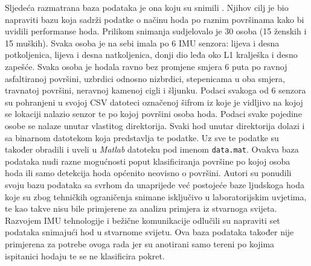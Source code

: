 \documentclass[times, utf8, diplomski]{fer}
\begin{document}
Sljedeća razmatrana baza podataka je ona koju su snimili \cite{uneven}. Njihov cilj je bio napraviti bazu koja sadrži podatke o
načinu hoda po raznim površinama kako bi uvidili performanse hoda. Prilikom snimanja sudjelovalo je 30 osoba (15 ženskih i
15 muških). Svaka osoba je na sebi imala po 6 IMU senzora: lijeva i desna potkoljenica, lijeva i desna natkoljenica, donji dio leđa
oko L1 kralješka i desno zapešće. Svaka osoba je hodala ravno bez promjene smjera 6 puta po ravnoj asfaltiranoj površini, uzbrdici
odnosno nizbrdici, stepenicama u oba smjera, travnatoj površini, neravnoj kamenoj cigli i šljunku. Podaci svakoga od 6 senzora su
pohranjeni u svojoj CSV datoteci označenoj šifrom iz koje je vidljivo na kojoj se lokaciji nalazio senzor te po kojoj površini
osoba hoda. Podaci svake pojedine osobe se nalaze unutar vlastitog direktorija. Svaki hod unutar direktorija dolazi i sa binarnom
datotekom koja predstavlja te podatke. Uz sve te podatke \cite{uneven} su također obradili i uveli u \textit{Matlab} datoteku pod 
imenom \texttt{data.mat}. Ovakva baza podataka nudi razne mogućnosti poput klasificiranja površine po kojoj osoba hoda ili samo 
detekcija hoda općenito neovisno o površini. Autori su ponudili svoju bazu podataka sa svrhom da unaprijede već postojeće baze
ljudskoga hoda koje su zbog tehničkih ograničenja snimane isključivo u laboratorijskim uvjetima, te kao takve nisu bile primjerene
za analizu primjera iz stvarnoga svijeta. Razvojem IMU tehnologije i bežične komunikacije \cite{uneven} odlučili su napraviti set podataka
snimajući hod u stvarnome svijetu. Ova baza podataka također nije primjerena za potrebe ovoga rada jer su anotirani samo tereni
po kojima ispitanici hodaju te se ne klasificira pokret.
\end{document}
